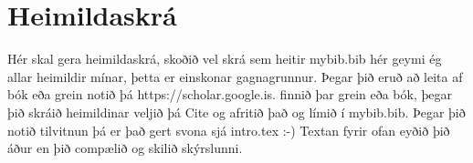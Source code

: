 \section{Heimildaskrá}
Hér skal gera heimildaskrá, skoðið vel skrá sem heitir mybib.bib hér geymi ég allar heimildir mínar, þetta er einskonar gagnagrunnur. Þegar þið eruð að leita af bók eða grein notið þá https://scholar.google.is. finnið þar grein eða bók, þegar þið skráið heimildinar veljið þá Cite og afritið það og límið í mybib.bib. Þegar þið notið tilvitnun þá er það gert svona sjá intro.tex :-)
Textan fyrir ofan eyðið þið áður en þið compælið og skilið skýrslunni.